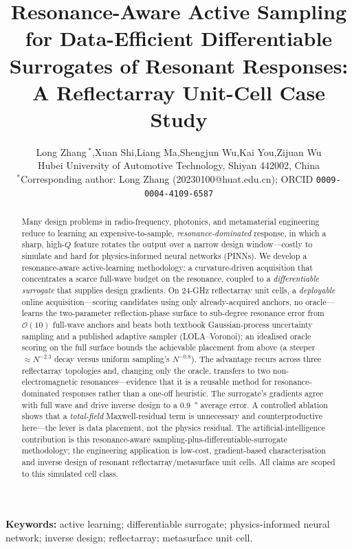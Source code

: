 \documentclass[11pt]{article}
\title{\bfseries Resonance-Aware Active Sampling for Data-Efficient Differentiable Surrogates
of Resonant Responses: A Reflectarray Unit-Cell Case Study}
\author{Long Zhang\,$^{*}$,\quad Xuan Shi,\quad Liang Ma,\quad Shengjun Wu,\quad Kai You,\quad Zijuan Wu\\[2pt]
\small Hubei University of Automotive Technology, Shiyan 442002, China\\
\small $^{*}$Corresponding author: Long Zhang (20230100@huat.edu.cn); ORCID \texttt{0009-0004-4109-6587}}
\date{}
\begin{document}
\maketitle

\begin{abstract}
\noindent
Many design problems in radio-frequency, photonics, and metamaterial engineering reduce to learning an
expensive-to-sample, \emph{resonance-dominated} response, in which a sharp, high-$Q$ feature rotates the
output over a narrow design window---costly to simulate and hard for physics-informed neural networks
(PINNs). We develop a resonance-aware active-learning methodology: a curvature-driven acquisition that
concentrates a scarce full-wave budget on the resonance, coupled to a \emph{differentiable surrogate} that
supplies design gradients. On 24-GHz reflectarray unit cells, a \emph{deployable} online acquisition---scoring
candidates using only already-acquired anchors, no oracle---learns the two-parameter reflection-phase
surface to sub-degree resonance error from $\mathcal{O}(10)$ full-wave anchors and beats both textbook
Gaussian-process uncertainty sampling and a published adaptive sampler (LOLA--Voronoi); an idealised oracle
scoring on the full surface bounds the achievable placement from above (a steeper $\approx\!N^{-2.3}$ decay
versus uniform sampling's $N^{-0.8}$). The advantage recurs across three reflectarray topologies and,
changing only the oracle, transfers to two non-electromagnetic resonances---evidence that it is a reusable method
for resonance-dominated responses rather than a one-off heuristic. The surrogate's
gradients agree with full wave and drive inverse design to a \SI{0.9}{\degree} average error. A controlled
ablation shows that a \emph{total-field} Maxwell-residual term is unnecessary and counterproductive here---the
lever is data placement, not the physics residual. The artificial-intelligence contribution is this
resonance-aware sampling-plus-differentiable-surrogate methodology; the engineering application is low-cost,
gradient-based characterisation and inverse design of resonant reflectarray/metasurface unit cells. All
claims are scoped to this simulated cell class.
\end{abstract}

\noindent\textbf{Keywords:} active learning; differentiable surrogate; physics-informed neural network;
inverse design; reflectarray; metasurface unit cell.
\end{document}
